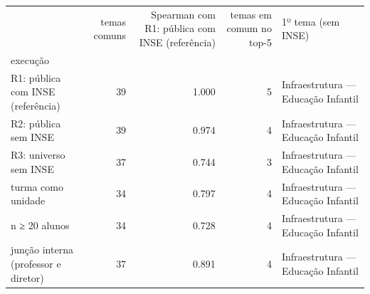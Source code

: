 \begin{tabular}{lrrrl}
\toprule
 & temas comuns & Spearman com R1: pública com INSE (referência) & temas em comum no top-5 & 1º tema (sem INSE) \\
execução &  &  &  &  \\
\midrule
R1: pública com INSE (referência) & 39 & 1.000 & 5 & Infraestrutura — Educação Infantil \\
R2: pública sem INSE & 39 & 0.974 & 4 & Infraestrutura — Educação Infantil \\
R3: universo sem INSE & 37 & 0.744 & 3 & Infraestrutura — Educação Infantil \\
turma como unidade & 34 & 0.797 & 4 & Infraestrutura — Educação Infantil \\
n ≥ 20 alunos & 34 & 0.728 & 4 & Infraestrutura — Educação Infantil \\
junção interna (professor e diretor) & 37 & 0.891 & 4 & Infraestrutura — Educação Infantil \\
\bottomrule
\end{tabular}

